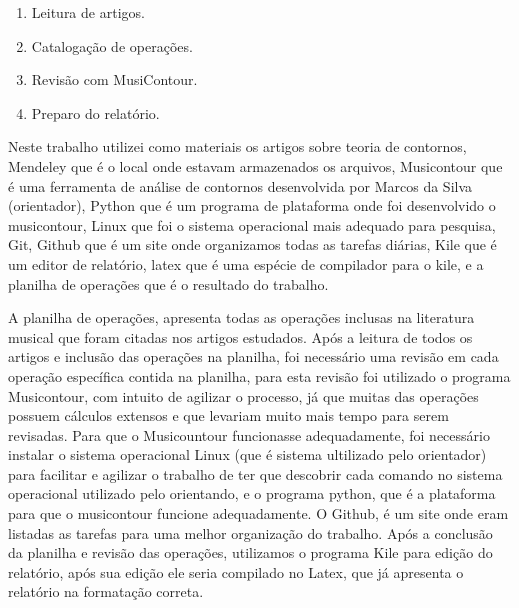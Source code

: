 \documentclass[11pt]{article}
\begin{document}
\label{sec:materiais}

  \begin{enumerate} 
\item Leitura de artigos.
\item Catalogação de operações.
\item Revisão com MusiContour.
\item Preparo do relatório.
\end{enumerate}

Neste trabalho utilizei como materiais os artigos sobre teoria de contornos, Mendeley
que é o local onde estavam armazenados os arquivos, Musicontour que é uma ferramenta 
de análise de contornos desenvolvida por Marcos da Silva (orientador), Python que é um 
programa de plataforma onde foi desenvolvido o musicontour, Linux que foi o  sistema 
operacional mais adequado para pesquisa, Git, Github que é um site onde organizamos 
todas as tarefas diárias, Kile que é um editor de relatório, latex que é uma espécie 
de compilador para o kile, e a planilha de operações que é o resultado do trabalho.

A planilha de operações, apresenta todas as operações inclusas na literatura musical
que foram citadas nos artigos estudados. Após a leitura de todos os artigos e inclusão das
operações na planilha, foi necessário uma revisão em cada operação específica contida 
na planilha, para esta revisão foi utilizado o programa Musicontour, com intuito de agilizar
o processo, já que muitas das operações possuem cálculos extensos e que levariam muito mais
tempo para serem revisadas. Para que o Musicountour funcionasse adequadamente, foi necessário
instalar o sistema operacional Linux (que é sistema ultilizado pelo orientador) para facilitar
e agilizar o trabalho de ter que descobrir cada comando no sistema operacional utilizado pelo
orientando, e o programa python, que é a plataforma para que o musicontour funcione 
adequadamente. 
O Github, é um site onde eram listadas as tarefas para uma melhor organização do trabalho.
Após a conclusão da planilha e revisão das operações, utilizamos o programa Kile para edição
do relatório, após sua edição ele seria compilado no Latex, que já apresenta o relatório
na formatação correta.
\end{document}
